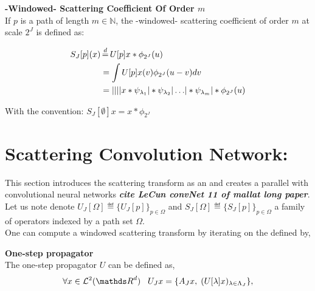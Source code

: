 \documentclass[a4paper,11pt]{report}
\begin{document}
{      \begin{defn} \textbf{-Windowed- Scattering Coefficient Of Order $m$}\\
				If $p$ is a path of length $m \in \mathds{N}$, the -windowed- scattering coefficient of order $m$ at scale $2^{J}$ is defined as:
				
				\begin{equation}
					\label{eq:ST windowed}
					\begin{split}
						S_{J}[p](x) &\eqdef U[p]x \ast \phi_{2^{J}}(u) \\
									&= \int U[p]x(v) \phi_{2^{J}}(u-v) dv \\
									&= \abs{\abs{\abs{\abs{x \ast \psi_{\lambda_{1}}} \ast \psi_{\lambda_{2}}} 
							\dots } \ast \psi_{\lambda_{m}}} \ast \phi_{2^{J}}(u)
					\end{split}
				\end{equation}
				
				With the convention: $S_{J}[\emptyset]x = x \ast \phi_{2^{J}}$\\
      	\label{def:SC windozed}
      \end{defn}


		\section{Scattering Convolution Network:}
			\label{seq:ST/SCN}
			
			This section introduces the scattering transform as an  and creates a parallel with convolutional neural networks \textbf{\textit{cite LeCun convNet 11 of mallat long paper}}. Let us note denote $U_{J}[\Omega] \eqdef \{U_{J}[p]\}_{p \in \Omega}$ and $S_{J}[\Omega] \eqdef \{S_{J}[p]\}_{p \in \Omega}$ a family of operators indexed by a path set $\Omega$.\\
			
			One can compute a windowed scattering transform by iterating on the  defined by,
			
			\begin{defn}  \textbf{One-step propagator}\\
				The one-step propagator $U$ can be defined as,
				\begin{equation}
					\forall x \in \mathcal{L}^{2}(\dsR^{d}) \;\;\; U_{J} x = \{ A_{J}x , \; (U[\lambda]x)_{\lambda \in \Lambda_{J}} \},
					\label{eq:One step propagator}
				\end{equation}
				

\end{defn}}
\end{document}
